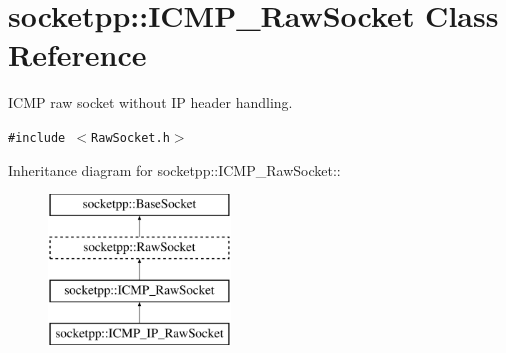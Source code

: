 \hypertarget{classsocketpp_1_1ICMP__RawSocket}{
\section{socketpp::ICMP\_\-RawSocket Class Reference}
\label{classsocketpp_1_1ICMP__RawSocket}
}
ICMP raw socket without IP header handling.  


{\tt \#include $<$RawSocket.h$>$}

Inheritance diagram for socketpp::ICMP\_\-RawSocket::\begin{figure}[H]
\begin{center}
\leavevmode
\includegraphics[height=4cm]{classsocketpp_1_1ICMP__RawSocket}
\end{center}
\end{figure}

